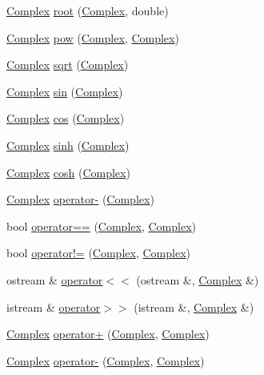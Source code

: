 \begin{DoxyCompactItemize}
\item 
\hyperlink{classComplex}{Complex} \hyperlink{classComplex_ae2cd8b168c490704321abcd702683819}{root} (\hyperlink{classComplex}{Complex}, double)
\item 
\hyperlink{classComplex}{Complex} \hyperlink{classComplex_a7707e4391c585ae5e47e8065f0a203f1}{pow} (\hyperlink{classComplex}{Complex}, \hyperlink{classComplex}{Complex})
\item 
\hyperlink{classComplex}{Complex} \hyperlink{classComplex_ac4198677aa75782c4bbfd813dac3a45c}{sqrt} (\hyperlink{classComplex}{Complex})
\item 
\hyperlink{classComplex}{Complex} \hyperlink{classComplex_a3387b908dc840d297692ef6423d357e1}{sin} (\hyperlink{classComplex}{Complex})
\item 
\hyperlink{classComplex}{Complex} \hyperlink{classComplex_a479a869da84bce5203ffb04c28317068}{cos} (\hyperlink{classComplex}{Complex})
\item 
\hyperlink{classComplex}{Complex} \hyperlink{classComplex_a4fd47b74daeb5e1888890bf9109f9b97}{sinh} (\hyperlink{classComplex}{Complex})
\item 
\hyperlink{classComplex}{Complex} \hyperlink{classComplex_ace4b8f6fe1d315f0c8cbc57bee0e4f05}{cosh} (\hyperlink{classComplex}{Complex})
\item 
\hyperlink{classComplex}{Complex} \hyperlink{classComplex_a13778c7e7964ee280a69177241c6269b}{operator-\/} (\hyperlink{classComplex}{Complex})
\item 
bool \hyperlink{classComplex_a77bd0e5bb91d5a6aecd18c9be2e363e6}{operator==} (\hyperlink{classComplex}{Complex}, \hyperlink{classComplex}{Complex})
\item 
bool \hyperlink{classComplex_ac13a8c53f86c90d2ec088f7bc63b6b3d}{operator!=} (\hyperlink{classComplex}{Complex}, \hyperlink{classComplex}{Complex})
\item 
ostream \& \hyperlink{classComplex_acaf8464158083ae26bf694610bc7a5e1}{operator$<$$<$} (ostream \&, \hyperlink{classComplex}{Complex} \&)
\item 
istream \& \hyperlink{classComplex_ab19a08bc53dc9bb99828aec0f7fac0e0}{operator$>$$>$} (istream \&, \hyperlink{classComplex}{Complex} \&)
\item 
\hyperlink{classComplex}{Complex} \hyperlink{classComplex_aee224be17e016896ab78393f41061c5d}{operator+} (\hyperlink{classComplex}{Complex}, \hyperlink{classComplex}{Complex})
\item 
\hyperlink{classComplex}{Complex} \hyperlink{classComplex_aed1fb5fba6be64d65b481675627e2711}{operator-\/} (\hyperlink{classComplex}{Complex}, \hyperlink{classComplex}{Complex})

\end{DoxyCompactItemize}
